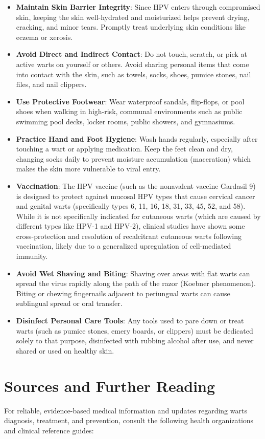 \begin{itemize}
    \item \textbf{Maintain Skin Barrier Integrity}: Since HPV enters through compromised skin, keeping the skin well-hydrated and moisturized helps prevent drying, cracking, and minor tears. Promptly treat underlying skin conditions like eczema or xerosis.
    \item \textbf{Avoid Direct and Indirect Contact}: Do not touch, scratch, or pick at active warts on yourself or others. Avoid sharing personal items that come into contact with the skin, such as towels, socks, shoes, pumice stones, nail files, and nail clippers.
    \item \textbf{Use Protective Footwear}: Wear waterproof sandals, flip-flops, or pool shoes when walking in high-risk, communal environments such as public swimming pool decks, locker rooms, public showers, and gymnasiums.
    \item \textbf{Practice Hand and Foot Hygiene}: Wash hands regularly, especially after touching a wart or applying medication. Keep the feet clean and dry, changing socks daily to prevent moisture accumulation (maceration) which makes the skin more vulnerable to viral entry.
    \item \textbf{Vaccination}: The HPV vaccine (such as the nonavalent vaccine Gardasil 9) is designed to protect against mucosal HPV types that cause cervical cancer and genital warts (specifically types 6, 11, 16, 18, 31, 33, 45, 52, and 58). While it is not specifically indicated for cutaneous warts (which are caused by different types like HPV-1 and HPV-2), clinical studies have shown some cross-protection and resolution of recalcitrant cutaneous warts following vaccination, likely due to a generalized upregulation of cell-mediated immunity.
    \item \textbf{Avoid Wet Shaving and Biting}: Shaving over areas with flat warts can spread the virus rapidly along the path of the razor (Koebner phenomenon). Biting or chewing fingernails adjacent to periungual warts can cause sublingual spread or oral transfer.
    \item \textbf{Disinfect Personal Care Tools}: Any tools used to pare down or treat warts (such as pumice stones, emery boards, or clippers) must be dedicated solely to that purpose, disinfected with rubbing alcohol after use, and never shared or used on healthy skin.
\end{itemize}

\section*{Sources and Further Reading}
For reliable, evidence-based medical information and updates regarding warts diagnosis, treatment, and prevention, consult the following health organizations and clinical reference guides:

